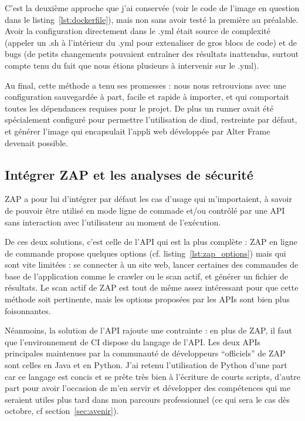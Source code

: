 C'est la deuxième approche que j'ai conservée (voir le code de l'image en question dans le listing~\ref{lst:dockerfile}), mais non sans avoir testé la première au préalable. Avoir la configuration directement dans le .yml était source de complexité (appeler un .sh à l'intérieur du .yml pour extenaliser de gros blocs de code) et de bugs (de petits changements pouvaient entraîner des résultats inattendus, surtout compte tenu du fait que nous étions plusieurs à intervenir sur le .yml).


Au final, cette méthode a tenu ses promesses : nous nous retrouvions avec une configuration sauvegardée à part, facile et rapide à importer, et qui comportait toutes les dépendances requises pour le projet. De plus un runner avait été spécialement configuré pour permettre l'utilisation de dind, restreinte par défaut, et générer l'image qui encapsulait l'appli web développée par Alter Frame devenait possible.

\subsection{Intégrer ZAP et les analyses de sécurité}
ZAP a pour lui d'intégrer par défaut les cas d'usage qui m'importaient, à savoir de pouvoir être utilisé en mode ligne de commade et/ou contrôlé par une API sans interaction avec l'utilisateur au moment de l'exécution.

De ces deux solutions, c'est celle de l'API qui est la plus complète : ZAP en ligne de commande propose quelques options (cf. listing~\ref{lst:zap_options}) mais qui sont vite limitées : se connecter à un site web, lancer certaines des commandes de base de l'application comme le crawler ou le scan actif, et générer un fichier de résultats. Le scan actif de ZAP est tout de même assez intéressant pour que cette méthode soit pertinente, mais les options proposées par les APIs sont bien plus foisonnantes.

Néanmoins, la solution de l'API rajoute une contrainte : en plus de ZAP, il faut que l'environnement de CI dispose du langage de l'API. Les deux APIs principales maintenues par la communauté de développeurs ``officiels'' de ZAP sont celles en Java et en Python. J'ai retenu l'utilisation de Python d'une part car ce langage est concis et se prête très bien à l'écriture de courts scripts, d'autre part pour avoir l'occasion de m'en servir et développer des compétences qui me seraient utiles plus tard dans mon parcours professionnel (ce qui sera le cas dès octobre, cf section~\ref{sec:avenir}).

